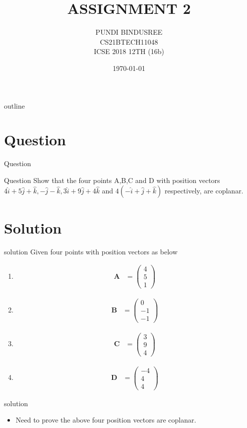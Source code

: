 \documentclass{beamer}
\title{ASSIGNMENT 2}
\author{PUNDI BINDUSREE \\ CS21BTECH11048\\ ICSE 2018 12TH (16b)}
\date{\today}
\let\vec\mathbf
\newcommand{\myvec}[1]{\ensuremath{\begin{pmatrix}#1\end{pmatrix}}}
\begin{document}
\begin{frame}
\titlepage
\end{frame}

\logo{}
\begin{frame}{outline}
\tableofcontents
\end{frame}

\section{Question}
\begin{frame}{Question}
\begin{block}{Question}
Show that the four points A,B,C and D with position vectors $4\hat{i}+5\hat{j}+\hat{k},-\hat{j}-\hat{k},3\hat{i}+9\hat{j}+4\hat{k}$ and $4(-\hat{i}+\hat{j}+\hat{k})$ respectively, are coplanar.
\end{block}
\end{frame}


\section{Solution}
\begin{frame}{solution}
 Given four points with position vectors as below
\begin{enumerate}
     \item \begin{align}\vec{A} & =\myvec{4\\5\\1}\end{align}
     \item \begin{align}\vec{B} & =\myvec{0\\-1\\-1}\end{align}     
     \item \begin{align}\vec{C} & =\myvec{3\\9\\4}\end{align}     
     \item \begin{align}\vec{D} & =\myvec{-4\\4\\4}\end{align}
\end{enumerate}
\end{frame}
 
\begin{frame}{solution}
\begin{itemize}
    \item Need to prove the above four position vectors are coplanar.
\end{itemize}
\end{frame}
 
\end{document}
